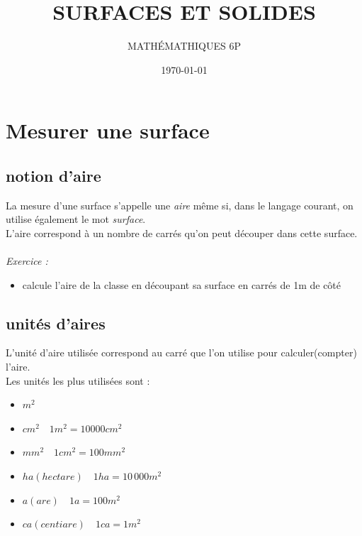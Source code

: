 \documentclass[utf8, a4paper, 12 pt]{article}
\title{\LARGE \textbf{SURFACES ET SOLIDES}}
\author{MATH\'EMATHIQUES 6P}
\date{\today}
\begin{document}
    \large
    \everymath{\displaystyle}
    \begin{titlepage}  
        \maketitle
    \end{titlepage} 
    \setcounter{page}{2}

    \section{Mesurer une surface}

        \subsection{notion d'aire}
            La mesure d'une surface s'appelle une \emph{aire} même si,
            dans le langage courant, 
            on utilise également le mot \emph{surface}.\\%
            L'aire correspond à un nombre de carrés qu'on peut découper dans cette surface.\\\\
            \emph{Exercice :}
            \begin{itemize}
                \item calcule l'aire de la classe en \og découpant \fg{} sa surface en carrés de 1m de côté
            \end{itemize} 

        \subsection{unités d'aires}
        
            L'unité d'aire utilisée correspond au carré que l'on utilise pour calculer(compter) l'aire.\\
            Les unités les plus utilisées sont :
            \begin{itemize}
                \item $m^2$
                \item $cm^2 \quad 1m^2 = 10 000 cm^2$
                \item $mm^2 \quad 1cm^2 = 100 mm^2$
                \item $ha (hectare) \quad 1 ha = 10\,000 m^2$
                \item $a (are) \quad 1 a = 100 m^2$
                \item $ca (centiare) \quad 1 ca = 1 m^2$ 
            \end{itemize} 
            \vspace{1\baselineskip}
            
\end{document}

